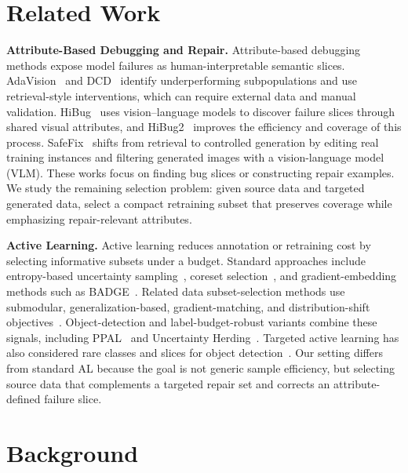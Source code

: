 \documentclass{article}
\newcommand{\hibug}{HiBug\xspace}
\begin{document}
\section{Related Work}



\noindent\textbf{Attribute-Based Debugging and Repair.} Attribute-based debugging methods expose model failures as human-interpretable semantic slices. AdaVision~\citep{gao2023adaptive} and DCD~\citep{singla2024data} identify underperforming subpopulations and use retrieval-style interventions, which can require external data and manual validation. \hibug~\citep{chen2023hibug} uses vision--language models to discover failure slices through shared visual attributes, and HiBug2~\citep{chen2025hibug2} improves the efficiency and coverage of this process. SafeFix~\citep{xu2025safefix} shifts from retrieval to controlled generation by editing real training instances and filtering generated images with a vision-language model (VLM). These works focus on finding bug slices or constructing repair examples. We study the remaining selection problem: given source data and targeted generated data, select a compact retraining subset that preserves coverage while emphasizing repair-relevant attributes.

\noindent\textbf{Active Learning.} Active learning reduces annotation or retraining cost by selecting informative subsets under a budget. Standard approaches include entropy-based uncertainty sampling~\citep{settles2009active}, coreset selection~\citep{sener2018active}, and gradient-embedding methods such as BADGE~\citep{ash2020deep}. Related data subset-selection methods use submodular, generalization-based, gradient-matching, and distribution-shift objectives~\citep{wei2015submodularity,killamsetty2021glister,killamsetty2021grad,kothawade2021similar,karanam2022orient}. Object-detection and label-budget-robust variants combine these signals, including PPAL~\citep{yang2024ppal} and Uncertainty Herding~\citep{bae2025uncertainty}. Targeted active learning has also considered rare classes and slices for object detection~\citep{kothawade2021talisman}. Our setting differs from standard AL because the goal is not generic sample efficiency, but selecting source data that complements a targeted repair set and corrects an attribute-defined failure slice.

\section{Background}
\end{document}
